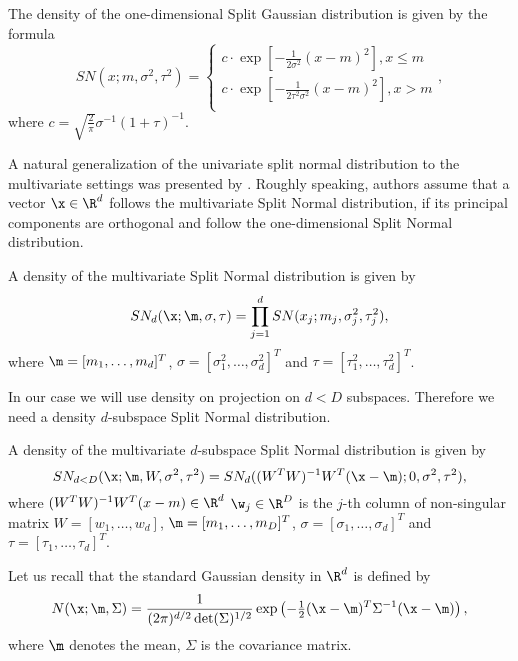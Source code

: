 

 The density of the one-dimensional Split Gaussian distribution is given by the formula
$$
SN(x;m,\sigma^2,\tau^2) = \left\{ \begin{array}{l}
c \cdot \exp[-\frac{1}{2\sigma^2}(x-m)^2], \textrm{$x\leq m$}\\
c \cdot \exp[-\frac{1}{2\tau^2\sigma^2}(x-m)^2], \textrm{$x>m$}\\
\end{array} \right. \!\!\!\!,
$$
where $c=\sqrt{\frac{2}{\pi}}\sigma^{-1}(1+\tau)^{-1}$. 

A natural generalization of the univariate split normal distribution to the multivariate settings was presented by \cite{villani2006multivariate}.
Roughly speaking, authors assume that a vector $\x \in \R^d$ follows the multivariate Split Normal distribution, if its principal components are orthogonal and follow the one-dimensional Split Normal distribution.

\begin{definition}\label{def:SN}
A density of the multivariate Split Normal distribution is given by
$$
 SN_{d}(\x; \m, \sigma,\tau)= \prod_{j=1}^{d} SN(x_j;m_j,\sigma_j^2,\tau_j^2),
$$
where  $\m = [m_1, \ldots, m_d]^T$, $\sigma = [\sigma_{1}^2,\ldots,\sigma_{d}^2]^T$ and $\tau=[\tau_{1}^2,\ldots,\tau_{d}^2]^T$.
\end{definition}


In our case we will use density on projection on $d<D$ subspaces. Therefore we need a density $d$-subspace Split Normal distribution.

\begin{definition}\label{def:GSN}
A density of the multivariate $d$-subspace Split Normal distribution is given by
$$
 SN_{d<D}(\x; \m,W, \sigma^2,\tau^2)=  SN_d((W^TW)^{-1}W^T(\x-\m);0,\sigma^2,\tau^2),
$$
where
$(W^TW)^{-1}W^T(x-m) \in \R^d$
 $\w_{j} \in \R^D$ is the $j$-th column of non-singular matrix $W = [w_{1},\ldots,w_{d}]$, $\m = [m_1, \ldots, m_D]^T$, $\sigma = [\sigma_{1},\ldots,\sigma_{d}]^T$ and $\tau=[\tau_{1},\ldots,\tau_{d}]^T$.
\end{definition}

Let us recall that the standard Gaussian density in $\R^d$ is defined by 
$$
N(\x;\m,\Sigma)=\frac{1}{(2\pi)^{d/2} \det(\Sigma)^{1/2}} \exp \left(-\tfrac{1}{2} (\x-\m)^T \Sigma^{-1}(\x-\m) \right),
$$
where $\m$ denotes the mean, $\Sigma$ is the covariance matrix.

